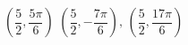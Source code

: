 { $\left( \dfrac{5}{2}, \dfrac{5\pi}{6} \right)$}
{$\left( \dfrac{5}{2}, -\dfrac{7\pi}{6} \right), \, \left( \dfrac{5}{2}, \dfrac{17\pi}{6} \right)$\\ }

